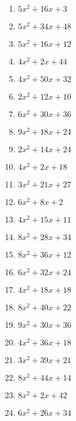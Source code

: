 \documentclass[9pt,dvipdfmx,a4paper]{article}
\begin{document}
\begin{multicols}{2}
\begin{enumerate}
\item
$ 5 x^{2} + 16 x + 3$

\item
$ 5 x^{2} + 34 x + 48$

\item
$ 5 x^{2} + 16 x + 12$

\item
$ 4 x^{2} + 2 x + 44$

\item
$ 4 x^{2} + 50 x + 32$

\item
$ 2 x^{2} + 12 x + 10$

\item
$ 6 x^{2} + 30 x + 36$

\item
$ 9 x^{2} + 18 x + 24$

\item
$ 2 x^{2} + 14 x + 24$

\item
$ 4 x^{2} + 2 x + 18$

\item
$ 3 x^{2} + 21 x + 27$

\item
$ 6 x^{2} + 8 x + 2$

\item
$ 4 x^{2} + 15 x + 11$

\item
$ 8 x^{2} + 28 x + 34$

\item
$ 8 x^{2} + 36 x + 12$

\item
$ 6 x^{2} + 32 x + 24$

\item
$ 4 x^{2} + 18 x + 18$

\item
$ 8 x^{2} + 40 x + 22$

\item
$ 9 x^{2} + 30 x + 36$

\item
$ 4 x^{2} + 36 x + 18$

\item
$ 3 x^{2} + 39 x + 21$

\item
$ 8 x^{2} + 44 x + 14$

\item
$ 8 x^{2} + 2 x + 42$

\item
$ 6 x^{2} + 26 x + 34$


\end{enumerate}
\end{multicols}
\end{document}
